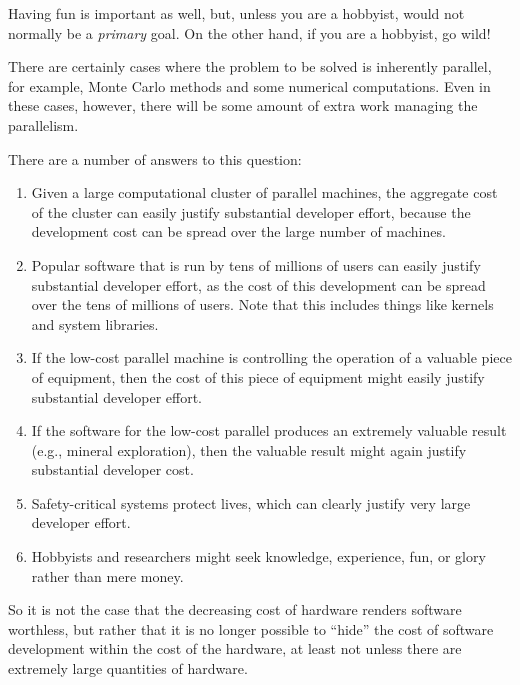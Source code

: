 	Having fun is important as well, but, unless you are a hobbyist,
	would not normally be a \emph{primary} goal.
	On the other hand, if you are a hobbyist, go wild!


	There are certainly cases where the problem to be solved is
	inherently parallel, for example, Monte Carlo methods and
	some numerical computations.
	Even in these cases, however, there will be some amount of
	extra work managing the parallelism.


	There are a number of answers to this question:
	\begin{enumerate}
	\item	Given a large computational cluster of parallel machines,
		the aggregate cost of the cluster can easily justify
		substantial developer effort, because the development
		cost can be spread over the large number of machines.
	\item	Popular software that is run by tens of millions of users
		can easily justify substantial developer effort,
		as the cost of this development can be spread over the tens
		of millions of users.
		Note that this includes things like kernels and system
		libraries.
	\item	If the low-cost parallel machine is controlling the operation
		of a valuable piece of equipment, then the cost of this
		piece of equipment might easily justify substantial
		developer effort.
	\item	If the software for the low-cost parallel produces an
		extremely valuable result (e.g., mineral exploration),
		then the valuable result might again justify substantial
		developer cost.
	\item	Safety-critical systems protect lives, which can clearly
		justify very large developer effort.
	\item	Hobbyists and researchers might seek knowledge, experience,
		fun, or glory rather than mere money.
	\end{enumerate}
	So it is not the case that the decreasing cost of hardware renders
	software worthless, but rather that it is no longer possible to
	``hide'' the cost of software development within the cost of
	the hardware, at least not unless there are extremely large
	quantities of hardware.


